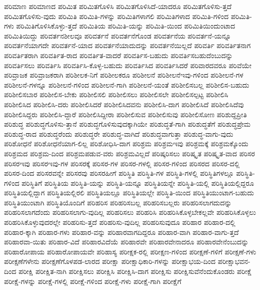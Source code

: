 {ಪರಿಮಾಣ
ಪರಿಮಾಣದ
ಪರಿಮಿತ
ಪರಿಮಿತಗೊಳಿಸಿ
ಪರಿಮಿತಗೊಳಿಸಿದೆ-ಯಾದರೂ
ಪರಿಮಿತಗೊಳಿಸು-ತ್ತದೆ
ಪರಿಮಿತಗೊಳಿಸು-ವುದು
ಪರಿಮಿತಿ
ಪರಿಮಿತಿ-ಗಳನ್ನು
ಪರಿಮಿತಿಗಳಾಗಲಿ
ಪರಿಮಿತಿಗಳಾದ
ಪರಿಮಿತಿ-ಗಳಿಂದ
ಪರಿಮಿತಿ-ಗಳು
ಪರಿಮಿತಿಗೊಳಿಸಿಕೊಳ್ಳು-ತ್ತದೆ
ಪರಿಮಿತಿಯ
ಪರಿಮಿತಿ-ಯನ್ನು
ಪರಿಮಿತಿ-ಯಿಂದ
ಪರಿಮಿತಿಯಿಂದುಂಟಾದ
ಪರಿಮಿತಿಯಿದ್ದು
ಪರಿವರ್ತನಶೀಲವೂ
ಪರಿವರ್ತನೆ
ಪರಿವರ್ತನೆಗೊಂಡ
ಪರಿವರ್ತನೆಯ
ಪರಿವರ್ತನೆ-ಯನ್ನೂ
ಪರಿವರ್ತನೆಯಾಗದೇ
ಪರಿವರ್ತನೆ-ಯಾದ
ಪರಿವರ್ತನೆಯಾದುದನ್ನು
ಪರಿವರ್ತನೆಯಿಲ್ಲದೆ
ಪರಿವರ್ತಿ
ಪರಿವರ್ತಿತನಾಗ
ಪರಿವರ್ತಿತರಾಗಿ
ಪರಿವರ್ತಿತ-ರಾದ
ಪರಿವರ್ತಿತ-ವಾದರೆ
ಪರಿವರ್ತಿಸ-ಬಹುದು
ಪರಿವರ್ತಿಸಬಹುದೆಂಬುದನ್ನು
ಪರಿವರ್ತಿಸಲು
ಪರಿವರ್ತಿಸಿ
ಪರಿವರ್ತಿಸಿ-ಕೊಳ್ಳ-ಬಹುದು
ಪರಿವರ್ತಿಸಿದ
ಪರಿವರ್ತಿಸಿದರೆ
ಪರಿವಾರದವರೂ
ಪರಿವೆಯೇ
ಪರಿವ್ರಾಜಕ
ಪರಿವ್ರಾಜಕರಾಗಿ
ಪರಿಶೀಲಕ-ನಿಗೆ
ಪರಿಶೀಲಕರೂ
ಪರಿಶೀಲನೆ
ಪರಿಶೀಲನೆಇವು-ಗಳಿಂದ
ಪರಿಶೀಲನೆ-ಗಳ
ಪರಿಶೀಲನೆ-ಗಳನ್ನೂ
ಪರಿಶೀಲನೆ-ಗಳಿಂದ
ಪರಿಶೀಲನೆ-ಗಾಗಿ
ಪರಿಶೀಲನೆ-ಯಂತೆ
ಪರಿಶೀಲಿಸಬಲ್ಲ
ಪರಿಶೀಲಿಸ-ಬಹುದು
ಪರಿಶೀಲಿಸಬಾರ
ಪರಿಶೀಲಿಸ-ಬೇಕು
ಪರಿಶೀಲಿಸಲಿ
ಪರಿಶೀಲಿಸಲು
ಪರಿಶೀಲಿಸಲೇ
ಪರಿಶೀಲಿಸಲ್ಪಟ್ಟ
ಪರಿಶೀಲಿಸಿ
ಪರಿಶೀಲಿಸಿದ
ಪರಿಶೀಲಿಸಿ-ದರು
ಪರಿಶೀಲಿಸಿದರೆ
ಪರಿಶೀಲಿಸಿದವನು
ಪರಿಶೀಲಿಸಿ-ದಾಗ
ಪರಿಶೀಲಿಸಿದೆ
ಪರಿಶೀಲಿಸಿದೆವು
ಪರಿಶೀಲಿಸಿದ್ದರು
ಪರಿಶೀಲಿಸಿ-ದ್ದಾರೆ
ಪರಿಶೀಲಿಸಿದ್ದೀರಾ
ಪರಿಶೀಲಿಸುವ
ಪರಿಶೀಲಿಸುವು
ಪರಿಶೀಲಿಸೋಣ
ಪರಿಶುದ್ದಪ್ರೀತಿ
ಪರಿಶುದ್ಧ
ಪರಿಶುದ್ಧಗೊಳಿಸು-ತ್ತಾನೆ
ಪರಿಶುದ್ಧಗೊಳಿಸುವುದಕ್ಕಾಗಿಯೇ
ಪರಿಶುದ್ಧತೆ-ಗಾಗಿ
ಪರಿಶುದ್ಧತೆಗೆ
ಪರಿಶುದ್ಧಪ್ರೇಮ
ಪರಿಶುದ್ಧ-ರಾದ
ಪರಿಶುದ್ಧರೆಂದು
ಪರಿಶುದ್ಧರೇ
ಪರಿಶುದ್ಧ-ವಾಗಿದೆ
ಪರಿಶುದ್ಧವಾಗುತ್ತಾ
ಪರಿಶುದ್ಧ-ವಾಗು-ವುದು
ಪರಿಶೋಧನೆ
ಪರಿಶೋಧನೆಯಾಗ-ಲಿಲ್ಲ
ಪರಿಶೋಧಿಸಿ-ದಾಗ
ಪರಿಶ್ರಮ
ಪರಿಶ್ರಮಇವು
ಪರಿಶ್ರಮಕ್ಕೆ
ಪರಿಶ್ರಮಕ್ಕೊಂದು
ಪರಿಶ್ರಮದ
ಪರಿಶ್ರಮ-ದಿಂದ
ಪರಿಶ್ರಮಪಡುವ-ವರು
ಪರಿಶ್ರಮವಿಲ್ಲದೆ
ಪರಿಷ್ಕರಿಸಲು
ಪರಿಷ್ಕೃತ
ಪರಿಷ್ಕೃತ-ವಾದ
ಪರಿಸರ
ಪರಿಸರಇವು
ಪರಿಸರಇವು-ಗಳ
ಪರಿಸರಕ್ಕೆ
ಪರಿಸರ-ಗಳ
ಪರಿಸರ-ಗಳಲ್ಲಿ
ಪರಿಸರ-ಗಳಿಂದ
ಪರಿಸರದ
ಪರಿಸರ-ದಲ್ಲಿ
ಪರಿಸರ-ದಿಂದ
ಪರಿಸರವನ್ನೇ
ಪರಿಸರವು
ಪರಿಸರಹೀಗೆ
ಪರಿಸ್ಥಿತಿ
ಪರಿಸ್ಥಿತಿ-ಗಳ
ಪರಿಸ್ಥಿತಿ-ಗಳಲ್ಲಿ
ಪರಿಸ್ಥಿತಿಗಳಲ್ಲೂ
ಪರಿಸ್ಥಿತಿ-ಗಳಿಂದ
ಪರಿಸ್ಥಿತಿಗೆ
ಪರಿಸ್ಥಿತಿಯ
ಪರಿಸ್ಥಿತಿ-ಯನ್ನು
ಪರಿಸ್ಥಿತಿ-ಯನ್ನೂ
ಪರಿಸ್ಥಿತಿಯನ್ನೇ
ಪರಿಸ್ಥಿತಿ-ಯಲ್ಲಿ
ಪರಿಸ್ಥಿತಿಯಲ್ಲಿದ್ದರೂ
ಪರಿಸ್ಥಿತಿಯಲ್ಲಿದ್ದಾಗ
ಪರಿಸ್ಥಿತಿಯಲ್ಲಿರಲಿ
ಪರಿಸ್ಥಿತಿಯಲ್ಲೂ
ಪರಿಸ್ಥಿತಿಯಲ್ಲೇ
ಪರಿಸ್ಥಿತಿ-ಯಿಂದ
ಪರಿಸ್ಥಿತಿಯುಂಟಾಗ-ಬಹುದು
ಪರಿಸ್ಥಿತಿಯುಂಟಾಗಿ
ಪರಿಸ್ಥಿತಿಯೊಂದಿಗೆ
ಪರಿಹರಿಸ
ಪರಿಹರಿಸಬಲ್ಲ
ಪರಿಹರಿಸಬಲ್ಲರು
ಪರಿಹರಿಸಲಾಗದುದನ್ನು
ಪರಿಹರಿಸಲಾಗದೆಂದು
ಪರಿಹರಿಸಲಾಗು-ವುದಿಲ್ಲ
ಪರಿಹರಿಸಲು
ಪರಿಹರಿಸಿ
ಪರಿಹರಿಸಿಕೊಳ್ಳಬೇಕಲ್ಲವೇ
ಪರಿಹರಿಸಿಕೊಳ್ಳಲು
ಪರಿಹರಿಸಿಕೊಳ್ಳುವುದರಲ್ಲೇ
ಪರಿಹರಿಸು-ತ್ತದೆ
ಪರಿಹರಿಸು-ವುದಿಲ್ಲ
ಪರಿಹರಿಸುವುದೂ
ಪರಿಹಾರ
ಪರಿಹಾರ-ದಲ್ಲಿ
ಪರಿಹಾರ-ಕ್ಕಾಗಿ
ಪರಿಹಾರ-ಗಳು
ಪರಿಹಾರ-ವನ್ನು
ಪರಿಹಾರವಾಗದಿದ್ದರೂ
ಪರಿಹಾರ-ವಾಗಿ
ಪರಿಹಾರ-ವಾಗು-ತ್ತದೆ
ಪರಿಹಾರವಾ-ಯಿತು
ಪರಿಹಾರ-ವಿದೆ
ಪರಿಹಾರವಿದೆಯೆ
ಪರಿಹಾರವೇ
ಪರಿಹಾರವೇನಾದರೂ
ಪರಿಹಾರವೇನೆಂಬುದನ್ನು
ಪರಿಹಾರೋಪಾಯ
ಪರಿಹಾರೋಪಾಯವೇ
ಪರಿಹಾಸ್ಯ
ಪರೀಕ್ಷಕ-ರಲ್ಲಿ
ಪರೀಕ್ಷಣ-ಗಳಿಂದ
ಪರೀಕ್ಷಣೆ-ಗಳಿಗೆ
ಪರೀಕ್ಷಣೆ-ಗಳು
ಪರೀಕ್ಷಣೆಗಳೇನು
ಪರೀಕ್ಷಣೆಗೊಳಪಡ-ಲಾರದ
ಪರೀಕ್ಷಾ
ಪರೀಕ್ಷಾಧಿಕಾರಿ-ಗಳನ್ನು
ಪರೀಕ್ಷಾಭಯ-ದಿಂದ
ಪರೀಕ್ಷಾಭವನ-ದಿಂದ
ಪರೀಕ್ಷಿ
ಪರೀಕ್ಷಿತ-ನಾಗಿ
ಪರೀಕ್ಷಿಸಲು
ಪರೀಕ್ಷಿಸಿ
ಪರೀಕ್ಷಿಸಿ-ದಾಗ
ಪರೀಕ್ಷಿಸು
ಪರೀಕ್ಷಿಸುವೆನೆಂದುಕೊಂಡರು
ಪರೀಕ್ಷೆ
ಪರೀಕ್ಷೆ-ಗಳನ್ನು
ಪರೀಕ್ಷೆ-ಗಳಲ್ಲಿ
ಪರೀಕ್ಷೆ-ಗಳಿಂದ
ಪರೀಕ್ಷೆ-ಗಳು
ಪರೀಕ್ಷೆ-ಗಾಗಿ
ಪರೀಕ್ಷೆಗೆ
}
